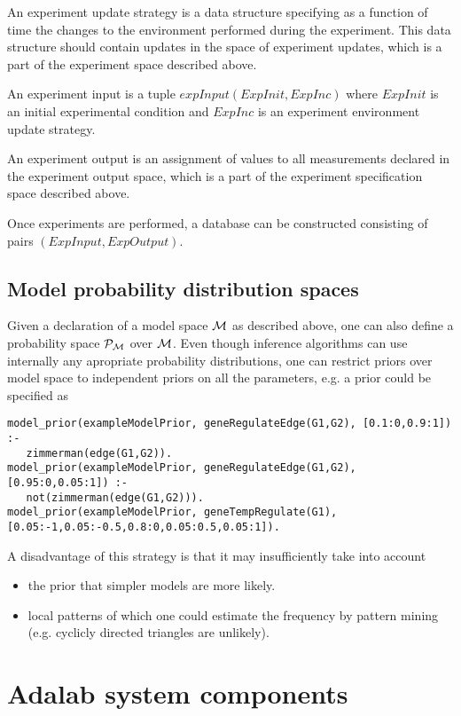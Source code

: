 \documentclass{article}
\begin{document}
An experiment update strategy is a data structure specifying as a function of time the changes to the environment performed during the experiment.  This data structure should contain updates in the space of experiment updates, which is a part of the experiment space described above.

An experiment input is a tuple $expInput(ExpInit,ExpInc)$
where $ExpInit$ is an initial experimental condition
and $ExpInc$ is an experiment environment update strategy.

An experiment output is an assignment of values to all measurements declared in the experiment output space, which is a part of the experiment specification space described above.

Once experiments are performed, a database can be constructed consisting of
pairs $(ExpInput,ExpOutput)$.

\subsection{Model probability distribution spaces}
\label{sec:modProbDist}
Given a declaration of a model space $\mathcal{M}$ as described above, one can also define a probability space $\mathcal{P}_\mathcal{M}$ over $\mathcal{M}$.
Even though inference algorithms can use internally any apropriate
probability distributions, one can restrict priors over model space
to independent priors on all the parameters, e.g. a prior could be specified as

\begin{verbatim}
model_prior(exampleModelPrior, geneRegulateEdge(G1,G2), [0.1:0,0.9:1]) :- 
   zimmerman(edge(G1,G2)).
model_prior(exampleModelPrior, geneRegulateEdge(G1,G2), [0.95:0,0.05:1]) :- 
   not(zimmerman(edge(G1,G2))).
model_prior(exampleModelPrior, geneTempRegulate(G1), [0.05:-1,0.05:-0.5,0.8:0,0.05:0.5,0.05:1]).
\end{verbatim}

A disadvantage of this strategy is that it may insufficiently take into account
\begin{itemize}
\item the prior that simpler models are more likely.
\item local patterns of which one could estimate the frequency by pattern mining (e.g. cyclicly directed triangles are unlikely).
\end{itemize}

\section{Adalab system components}
\end{document}
